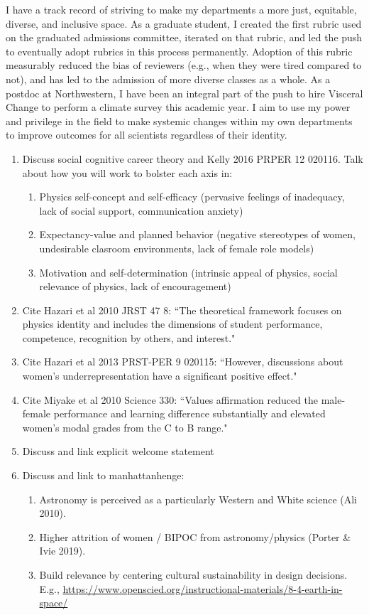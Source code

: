 \documentclass[11pt]{article}
\begin{document}
I have a track record of striving to make my departments a more just, equitable, diverse, and inclusive space.
As a graduate student, I created the first rubric used on the graduated admissions committee, iterated on that rubric, and led the push to eventually adopt rubrics in this process permanently.
Adoption of this rubric measurably reduced the bias of reviewers (e.g., when they were tired compared to not), and has led to the admission of more diverse classes as a whole.
As a postdoc at Northwestern, I have been an integral part of the push to hire Visceral Change to perform a climate survey this academic year.
I aim to use my power and privilege in the field to make systemic changes within my own departments to improve outcomes for all scientists regardless of their identity.


\begin{enumerate}
    \item Discuss social cognitive career theory and Kelly 2016 PRPER 12 020116. Talk about how you will work to bolster each axis in:
        \begin{enumerate}
            \item Physics self-concept and self-efficacy (pervasive feelings of inadequacy, lack of social support, communication anxiety)
            \item Expectancy-value and planned behavior (negative stereotypes of women, undesirable clasroom environments, lack of female role models)
            \item Motivation and self-determination (intrinsic appeal of physics, social relevance of physics, lack of encouragement)
        \end{enumerate}
    \item Cite Hazari et al 2010 JRST 47 8: ``The theoretical framework focuses on physics identity and includes the dimensions of student performance, competence, recognition by others, and interest."
    \item Cite Hazari et al 2013 PRST-PER 9 020115: ``However, discussions about women’s underrepresentation have a significant positive effect."
    \item Cite Miyake et al 2010 Science 330: ``Values affirmation reduced the male-female performance and learning difference substantially and elevated women’s modal grades from the C to B range."
    \item Discuss and link explicit welcome statement
    \item Discuss and link to manhattanhenge:
        \begin{enumerate}
            \item Astronomy is perceived as a particularly Western and White science (Ali 2010).
            \item Higher attrition of women / BIPOC from astronomy/physics (Porter \& Ivie 2019).
            \item Build relevance by centering cultural sustainability in design decisions. E.g., \url{https://www.openscied.org/instructional-materials/8-4-earth-in-space/}
        \end{enumerate}
\end{enumerate}


{\scriptsize

}
\end{document}
